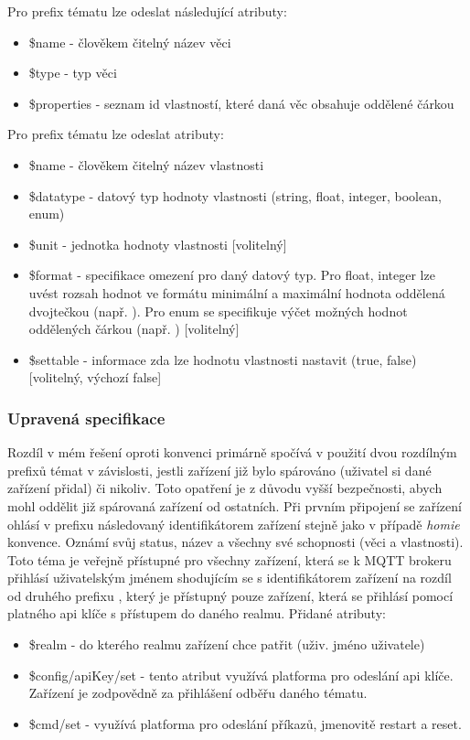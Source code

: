 Pro prefix tématu  lze odeslat následující atributy:
\begin{itemize}
    \item \$name - člověkem čitelný název věci
    \item \$type - typ věci
    \item \$properties - seznam id vlastností, které daná věc obsahuje oddělené čárkou
\end{itemize}

Pro prefix tématu  lze odeslat atributy:
\begin{itemize}
    \item \$name - člověkem čitelný název vlastnosti
    \item \$datatype - datový typ hodnoty vlastnosti (string, float, integer, boolean, enum)
    \item \$unit - jednotka hodnoty vlastnosti [volitelný]
    \item \$format - specifikace omezení pro daný datový typ. Pro float, integer lze uvést rozsah hodnot ve formátu minimální a maximální hodnota oddělená dvojtečkou (např. ). Pro enum se specifikuje výčet možných hodnot oddělených čárkou (např. ) [volitelný]
    \item \$settable - informace zda lze hodnotu vlastnosti nastavit (true, false) [volitelný, výchozí false]
\end{itemize}

\subsubsection{Upravená specifikace}
Rozdíl v mém řešení oproti  konvenci primárně spočívá v použití dvou rozdílným prefixů témat v závislosti, jestli zařízení již bylo spárováno (uživatel si dané zařízení přidal) či nikoliv. Toto opatření je z důvodu vyšší bezpečnosti, abych mohl oddělit již spárovaná zařízení od ostatních. Při prvním připojení se zařízení ohlásí v prefixu  následovaný identifikátorem zařízení stejně jako v případě \textit{homie} konvence. Oznámí svůj status, název a všechny své schopnosti (věci a vlastnosti). Toto téma je veřejně přístupné pro všechny zařízení, která se k MQTT brokeru přihlásí uživatelským jménem shodujícím se s identifikátorem zařízení na rozdíl od druhého prefixu , který je přístupný pouze zařízení, která se přihlásí pomocí platného api klíče s přístupem do daného realmu. Přidané atributy:
\begin{itemize}
    \item \$realm - do kterého realmu zařízení chce patřit (uživ. jméno uživatele)
    \item \$config/apiKey/set - tento atribut využívá platforma pro odeslání api klíče. Zařízení je zodpovědně za přihlášení odběřu daného tématu.
    \item \$cmd/set - využívá platforma pro odeslání příkazů, jmenovitě restart a reset.
\end{itemize}

